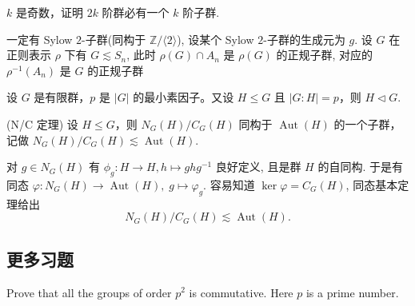 \setcounter{pb}{1}
\begin{problem}
    $k$ 是奇数，证明 $2k$ 阶群必有一个 $k$ 阶子群.
\end{problem}

\begin{vain}
    一定有 Sylow $2$-子群(同构于 $\mathbb{Z}/\langle 2 \rangle$), 设某个 Sylow $2$-子群的生成元为 $g$. 
    设 $G$ 在正则表示 $\rho$ 下有 $G \lesssim S_{n}$, 
    此时 $\rho(G)\cap A_{n}$ 是 $\rho(G)$ 的正规子群, 
    对应的 $\rho^{-1}(A_{n})$ 是 $G$ 的正规子群
\end{vain}

\setcounter{pb}{3}
\begin{problem}
    设 $G $ 是有限群，$p $ 是 $|G| $ 的最小素因子。又设 $H \leq G $ 且 $|G:H| = p $，则 $H \vartriangleleft G $. 
\end{problem}

\setcounter{pb}{4}
\begin{problem}
    (N/C 定理) 设 $H \leq G$，则 $N_G(H) / C_G(H)$ 同构于 $\operatorname{Aut}(H)$ 的一个子群，记做 $N_G(H) / C_G(H) \lesssim \operatorname{Aut}(H)$.
\end{problem}

\begin{solution}
    对 $g\in N_G(H)$ 有 $\phi_{g}\colon H\to H, h\mapsto g h g^{-1}$ 良好定义, 且是群 $H$ 的自同构. 于是有同态 $\varphi  \colon N_{G}(H)\to \operatorname{Aut}(H),\; g\mapsto \varphi_g$. 
    容易知道 $\ker\varphi=C_{G}(H)$, 同态基本定理给出
        \[
            N_G(H) / C_G(H) \lesssim \operatorname{Aut}(H).
        \]
\end{solution}

\subsection{更多习题}

\setcounter{pb}{5}

\begin{problem}
    Prove that all the groups of order $p^{2}$ is commutative. Here $p$ is a prime number.
\end{problem}

